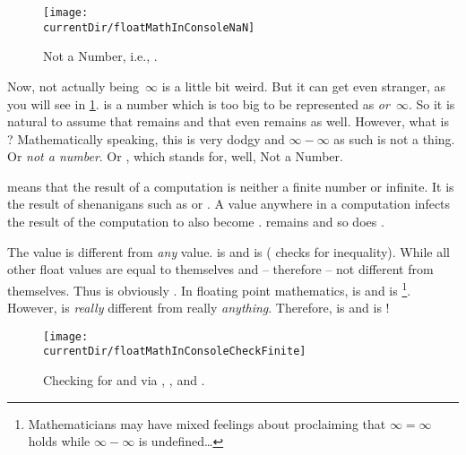 \begin{figure}%
\centering%
\texttt{[image: \\currentDir/floatMathInConsoleNaN]}%
\caption{Not a Number, i.e., .}%
\label{fig:floatMathInConsoleNaN}%
\end{figure}%

Now,  not actually being~$\infty$ is a little bit weird.
But it can get even stranger, as you will see in \cref{fig:floatMathInConsoleNaN}.
 is a number which is too big to be represented as  \emph{or}~$\infty$.
So it is natural to assume that  remains  and that even  remains  as well.
However, what is ?
Mathematically speaking, this is very dodgy and $\infty-\infty$ as such is not a thing.
Or \emph{not a number}.
Or , which stands for, well, Not a Number.

 means that the result of a computation is neither a finite number or infinite.
It is the result of shenanigans such as  or .
A  value anywhere in a computation infects the result of the computation to also become .
 remains  and so does .

The value  is different from \emph{any} value.
 is  and  is  (\pythonilIdx{!=} checks for inequality).
While all other float values are equal to themselves and -- therefore -- not different from themselves.
Thus  is obviously .
In floating point mathematics,  is  and  is \footnote{%
Mathematicians may have mixed feelings about proclaiming that $\infty=\infty$ holds while $\infty-\infty$ is undefined\dots}.
However,  is \emph{really} different from really \emph{anything}.
Therefore,  is  and  is !

\begin{figure}%
\centering%
\texttt{[image: \\currentDir/floatMathInConsoleCheckFinite]}%
\caption{Checking for  and  via , , and .}%
\label{fig:floatMathInConsoleCheckFinite}%
\end{figure}%

